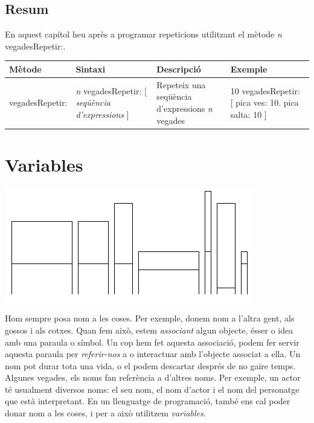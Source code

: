 \section{Resum}

En aquest capítol heu après a programar repeticions utilitzant el mètode \textsf{{\itshape n} vegadesRepetir:}. 

\vspace{5mm}
\noindent
{\small \begin{tabular}{p{22mm}p{45mm}p{38mm}p{28mm}}
\hline
\textbf{Mètode} & \textbf{Sintaxi} & \textbf{Descripció} & \textbf{Exemple}\\
\hline
\textsf{vegadesRepetir:} & \textsf{{\itshape n} vegadesRepetir:\newline \hspace*{5mm} [ {\itshape seqüència d'expressions} ]} &
Repeteix una seqüència \newline d'expressions \emph{n} vegades
& \textsf{10 vegadesRepetir: \newline \hspace*{5mm} [ pica ves: 10. \newline \hspace*{5mm} pica salta: 10 ]} \\
\hline
\end{tabular}}

\chapter{Variables}
\label{cap8}

\includegraphics[scale=1.0]{Imatges/figura8-0.png}

Hom sempre posa nom a les coses. Per exemple, donem nom a l'altra gent, als gossos i als cotxes. Quan fem això, estem \emph{associant} algun objecte, ésser o idea amb una paraula o símbol. Un cop hem fet aquesta associació, podem fer servir aquesta paraula per \emph{referir-nos} a o interactuar amb l'objecte associat a ella. Un nom pot durar tota una vida, o el podem descartar després de no gaire temps. Algunes vegades, els noms fan referència a d'altres noms. Per exemple, un actor té usualment diversos noms: el seu nom, el nom d'actor i el nom del personatge que està interpretant. En un llenguatge de programació, també ens cal poder donar nom a les coses, i per a això utilitzem \emph{variables}.

